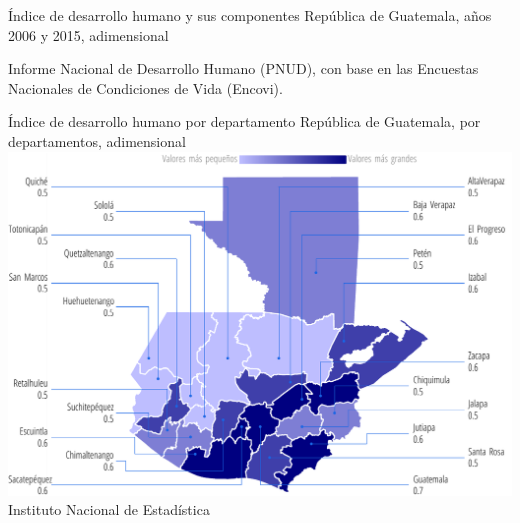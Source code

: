  
 {%
 }%
 {%
 	Índice de desarrollo humano y sus componentes} %
 {%
 	República de Guatemala, años 2006 y 2015, adimensional} %
 {%
 	\begin{tikzpicture}[x=1pt,y=1pt]    \end{tikzpicture}}%
 {%
 	Informe Nacional de Desarrollo Humano (PNUD), con base en las Encuestas Nacionales de Condiciones de Vida (Encovi).} %
   
   
   
   
   	{%
   	}%
   	{%
   		Índice de desarrollo humano por departamento
   	}%
   	{%
   		República de Guatemala, por departamentos, adimensional} %
   	{%
   		\includegraphics[width=52\cuadri]{graficas/1_11.pdf}}%
   	{%
   		Instituto Nacional de Estadística} %
 
 
 
 
      
